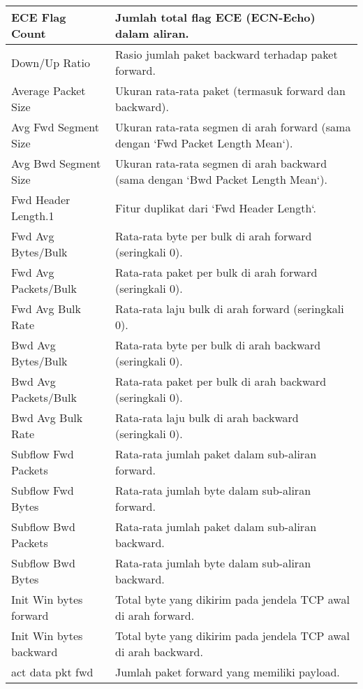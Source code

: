 \documentclass[a4paper,12pt]{report}
\begin{document}
\begin{table}[h!]
	\centering
	\begin{longtable}{|p{3cm} | p{10cm} |}
		\hline
		ECE Flag Count & Jumlah total flag ECE (ECN-Echo) dalam aliran. \\
		\hline
		Down/Up Ratio & Rasio jumlah paket backward terhadap paket forward. \\
		\hline
		Average Packet Size & Ukuran rata-rata paket (termasuk forward dan backward). \\
		\hline
		Avg Fwd Segment Size & Ukuran rata-rata segmen di arah forward (sama dengan `Fwd Packet Length Mean`). \\
		\hline
		Avg Bwd Segment Size & Ukuran rata-rata segmen di arah backward (sama dengan `Bwd Packet Length Mean`). \\
		\hline
		Fwd Header Length.1 & Fitur duplikat dari `Fwd Header Length`. \\
		\hline
		Fwd Avg Bytes/Bulk & Rata-rata byte per bulk di arah forward (seringkali 0). \\
		\hline
		Fwd Avg Packets/Bulk & Rata-rata paket per bulk di arah forward (seringkali 0). \\
		\hline
		Fwd Avg Bulk Rate & Rata-rata laju bulk di arah forward (seringkali 0). \\
		\hline
		Bwd Avg Bytes/Bulk & Rata-rata byte per bulk di arah backward (seringkali 0). \\
		\hline
		Bwd Avg Packets/Bulk & Rata-rata paket per bulk di arah backward (seringkali 0). \\
		\hline
		Bwd Avg Bulk Rate & Rata-rata laju bulk di arah backward (seringkali 0). \\
		\hline
		Subflow Fwd Packets & Rata-rata jumlah paket dalam sub-aliran forward. \\
		\hline
		Subflow Fwd Bytes & Rata-rata jumlah byte dalam sub-aliran forward. \\
		\hline
		Subflow Bwd Packets & Rata-rata jumlah paket dalam sub-aliran backward. \\
		\hline
		Subflow Bwd Bytes & Rata-rata jumlah byte dalam sub-aliran backward. \\
		\hline
		Init Win bytes forward & Total byte yang dikirim pada jendela TCP awal di arah forward. \\
		\hline
		Init Win bytes backward & Total byte yang dikirim pada jendela TCP awal di arah backward. \\
		\hline
		act data pkt fwd & Jumlah paket forward yang memiliki payload. \\

\end{longtable}
\end{table}
\end{document}
